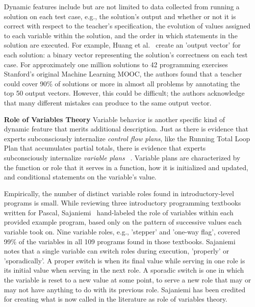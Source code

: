 Dynamic features include but are not limited to data collected from running a solution on each test case, e.g., the solution's output and whether or not it is correct with respect to the teacher's specification, the evolution of values assigned to each variable within the solution, and the order in which statements in the solution are executed. For example, Huang et al.~\cite{MOOCshop} create an 'output vector' for each solution: a binary vector representing the solution's correctness on each test case. For approximately one million solutions to 42 programming exercises Stanford's original Machine Learning MOOC, the authors found that a teacher could cover 90\% of solutions or more in almost all problems by annotating the top 50 output vectors. However, this could be difficult; the authors acknowledge that many different mistakes can produce to the same output vector.

{\bf Role of Variables Theory}
Variable behavior is another specific kind of dynamic feature that merits additional description. Just as there is evidence that experts subconsciously internalize {\it control flow plans}, like the Running Total Loop Plan that accumulates partial totals, there is evidence that experts subconsciously internalize {\it variable plans} ~\cite{variableplans}. Variable plans are characterized by the function or role that it serves in a function, how it is initialized and updated, and conditional statements on the variable's value. 

Empirically, the number of distinct variable roles found in introductory-level programs is small. While reviewing three introductory programming textbooks written for Pascal, Sajaniemi~\cite{sajaniemi2002empirical} hand-labeled the role of variables within each provided example program, based only on the pattern of successive values each variable took on. Nine variable roles, e.g., 'stepper' and 'one-way flag', covered 99\% of the variables in all 109 programs found in those textbooks. Sajaniemi notes that a single variable can switch roles during execution, 'properly' or 'sporadically'. A proper switch is when its final value while serving in one role is its initial value when serving in the next role. A sporadic switch is one in which the variable is reset to a new value at some point, to serve a new role that may or may not have anything to do with its previous role.  Sajaniemi has been credited for creating what is now called in the literature as role of variables theory. 

